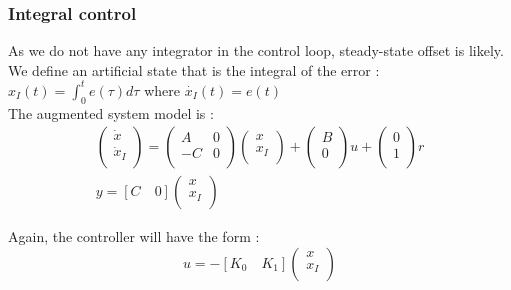 \documentclass[../main.tex]{subfiles}
\begin{document}
\subsubsection{Integral control}
As we do not have any integrator in the control loop, steady-state offset is likely. \\
We define an artificial state that is the integral of the error : $x_I(t) = \int_0^t e(\tau)d\tau$ where $\dot{x_I}(t) = e(t)$\\

The augmented system model is : \begin{equation}\begin{gathered}
    \begin{pmatrix}
        \dot{x}\\ \dot{x}_I\\
    \end{pmatrix} = \begin{pmatrix}
        A & 0\\ -C & 0\\
    \end{pmatrix} \begin{pmatrix}
        x \\ x_I\\
    \end{pmatrix} + \begin{pmatrix}
        B\\0\\
    \end{pmatrix}u + \begin{pmatrix}
        0\\1\\
    \end{pmatrix}r\\
    y = [C \quad 0 ] \begin{pmatrix}
        x\\ x_I\\
    \end{pmatrix}
    \end{gathered}
\end{equation}

Again, the controller will have the form : \begin{equation}
    u = -[K_0 \quad K_1] \begin{pmatrix}
        x\\ x_I\\
    \end{pmatrix}
\end{equation}
\end{document}
